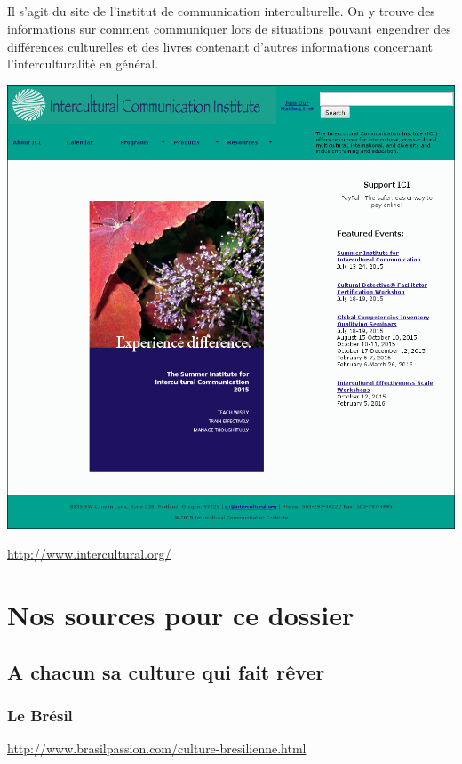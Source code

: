 \paragraph{} Il s'agit du site de l'institut de communication interculturelle.
On y trouve des informations sur comment communiquer lors de situations
pouvant engendrer des différences culturelles et des livres contenant d'autres
informations concernant l'interculturalité en général.

\begin{center}
	\includegraphics[scale=0.25]{Intercultural.png}
\end{center}
\url{http://www.intercultural.org/}

\chapter{Nos sources pour ce dossier}

\section{A chacun sa culture qui fait rêver}

\subsection{Le Brésil}
\noindent
\url{http://www.brasilpassion.com/culture-bresilienne.html}


